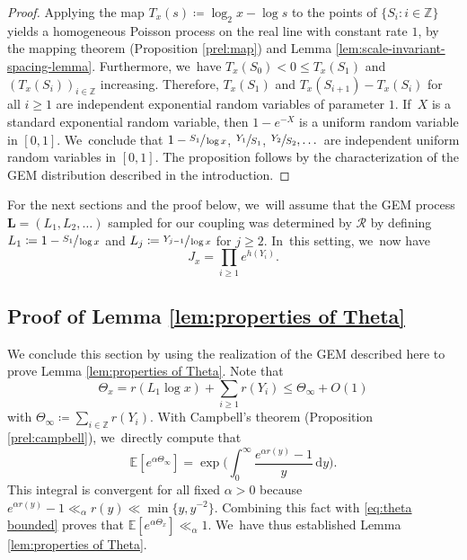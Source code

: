 \documentclass[JEP,XML,SOM,Unicode,published]{cedram}
\newcommand{\bL}{{\boldsymbol L}}
\newcommand{\ZZ}{\mathbb{Z}}
\newcommand{\EE}{\mathbb{E}}
\newcommand{\RS}{\mathscr{R}}
\newcommand{\bggg}{\bigg}
\theoremstyle{plain}
\theoremstyle{definition}
\begin{document}
\begin{proof}
Applying the map $T_x(s) \coloneqq \log_2 x - \log s$ to the points of \hbox{$\{S_i : i \in \ZZ\}$} yields a homogeneous Poisson process on the real line with constant rate $1$, by the mapping theorem (Proposition \ref{prel:map}) and Lemma \ref{lem:scale-invariant-spacing-lemma}. Furthermore, we~have \hbox{$T_x(S_0) \!<\! 0 \!\le\! T_x(S_1)$} and $(T_x(S_i))_{i \in \ZZ}$ increasing. Therefore, $T_x(S_1)$ and \hbox{$T_x(S_{i+1}) \!-\! T_x(S_i)$} for all $i \ge 1$ are independent exponential random variables of parameter $1$. If~$X$ is a standard exponential random variable, then $1-e^{-X}$ is a uniform random variable in $[0, 1]$. We~conclude that $1-\sfrac{S_1}{\log x}$, $\sfrac{Y_1}{S_1}$, $\sfrac{Y_2}{S_2},\dots$ are independent uniform random variables in $[0, 1]$. The proposition follows by the characterization of the GEM distribution described in the introduction.
\end{proof}

For the next sections and the proof below, we~will assume that the GEM process $\bL = (L_1, L_2, \ldots)$ sampled for our coupling was determined by $\RS$ by defining \hbox{$L_1 \coloneqq 1-\sfrac{S_1}{\log x}$} and $L_j \coloneqq \sfrac{Y_{j-1}}{\log x}$ for $j \ge 2$. In~this setting, we~now have
\begin{equation}
\label{eq:J_x alternative definition}
J_x = \prod_{i \ge 1} e^{h(Y_i)}.
\end{equation}

\subsection{Proof of Lemma \ref{lem:properties of Theta}}
We conclude this section by using the realization of the GEM described here to prove Lemma \ref{lem:properties of Theta}. Note that
\begin{equation}
\label{eq:theta bounded}
\Theta_x = r(L_1\log x) + \sum_{i \ge 1} r(Y_i) \le \Theta_\infty + O(1)
\end{equation}
with $\Theta_\infty \coloneqq \sum_{i \in \ZZ} r(Y_i)$. With Campbell's theorem (Proposition \ref{prel:campbell}), we~directly compute that
\begin{equation}
\label{eq:mgf theta infty}
\EE[e^{\alpha \Theta_\infty}] = \exp\!\bggg(\!\int_{0}^\infty \frac{e^{\alpha r(y)} - 1}{y}\, \mathrm dy\bggg).
\end{equation}
This integral is convergent for all fixed $\alpha \!>\! 0$ because $e^{\alpha r(y)} -1 \!\ll_\alpha\! r(y) \!\ll\!\min\{y,y^{-2}\}$. Combining this fact with \eqref{eq:theta bounded} proves that $\EE[e^{\alpha \Theta_x}] \ll_\alpha 1$. We~have thus established Lemma \ref{lem:properties of Theta}.
\end{document}
